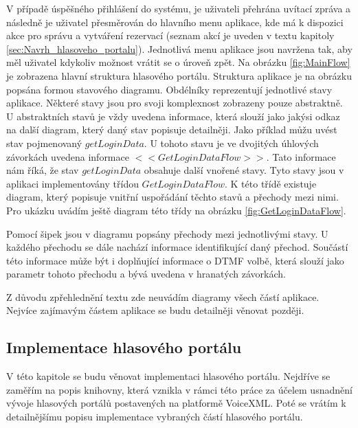 \documentclass[ing,male,java,dept460]{diploma}						%
\begin{document}

V případě úspěšného přihlášení do systému, je uživateli přehrána uvítací zpráva a následně je uživatel přesměrován do hlavního menu aplikace, kde má k dispozici akce pro správu a vytváření rezervací (seznam akcí je uveden v textu kapitoly \ref{sec:Navrh_hlasoveho_portalu}). Jednotlivá menu aplikace jsou navržena tak, aby měl uživatel kdykoliv možnost vrátit se o úroveň zpět. Na obrázku \ref{fig:MainFlow} je zobrazena hlavní struktura hlasového portálu. Struktura aplikace je na obrázku popsána formou stavového diagramu. Obdélníky reprezentují jednotlivé stavy aplikace. Některé stavy jsou pro svoji komplexnost zobrazeny pouze abstraktně. U abstraktních stavů je vždy uvedena informace, která slouží jako jakýsi odkaz na další diagram, který daný stav popisuje detailněji. Jako příklad můžu uvést stav pojmenovaný $getLoginData$. U tohoto stavu je ve dvojitých úhlových závorkách uvedena informace $<<GetLoginDataFlow>>$. Tato informace nám říká, že stav $getLoginData$ obsahuje další vnořené stavy. Tyto stavy jsou v aplikaci implementovány třídou $GetLoginDataFlow$. K této třídě existuje diagram, který popisuje vnitřní uspořádání těchto stavů a přechody mezi nimi. Pro ukázku uvádím ještě diagram této třídy na obrázku \ref{fig:GetLoginDataFlow}.


Pomocí šipek jsou v diagramu popsány přechody mezi jednotlivými stavy. U každého přechodu se dále nachází informace identifikující daný přechod. Součástí této informace může být i doplňující informace o DTMF volbě, která slouží jako parametr tohoto přechodu a bývá uvedena v hranatých závorkách.

Z důvodu zpřehlednění textu zde neuvádím diagramy všech částí aplikace. Nejvíce zajímavým částem aplikace se budu detailněji věnovat později.

\subsection{Implementace hlasového portálu}
V této kapitole se budu věnovat implementaci hlasového portálu. Nejdříve se zaměřím na popis knihovny, která vznikla v rámci této práce za účelem usnadnění vývoje hlasových portálů postavených na platformě VoiceXML. Poté se vrátím k detailnějšímu popisu implementace vybraných částí hlasového portálu.
\end{document}
